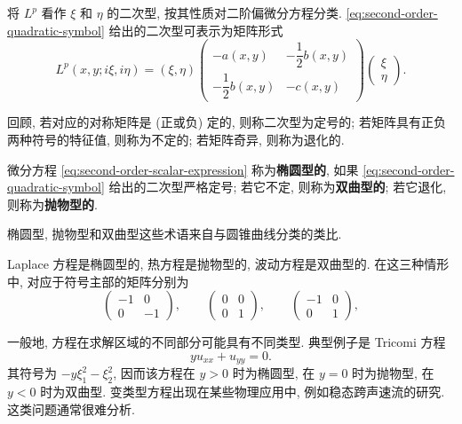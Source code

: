 将 $L^p$ 看作 $\xi$ 和 $\eta$ 的二次型, 按其性质对二阶偏微分方程分类. \eqref{eq:second-order-quadratic-symbol} 给出的二次型可表示为矩阵形式
\begin{equation}\label{eq:second-order-symbol-matrix}
L^p(x,y;i\xi,i\eta)=(\xi,\eta)\begin{pmatrix}-a(x,y)&-\dfrac12b(x,y)\\-\dfrac12b(x,y)&-c(x,y)\end{pmatrix}\begin{pmatrix}\xi\\\eta\end{pmatrix}.
\end{equation}


回顾, 若对应的对称矩阵是 (正或负) 定的, 则称二次型为定号的; 若矩阵具有正负两种符号的特征值, 则称为不定的; 若矩阵奇异, 则称为退化的.

\begin{Definition}
\label{def:second-order-scalar-type}
微分方程 \eqref{eq:second-order-scalar-expression} 称为\textbf{椭圆型的}, 如果 \eqref{eq:second-order-quadratic-symbol} 给出的二次型严格定号; 若它不定, 则称为\textbf{双曲型的}; 若它退化, 则称为\textbf{抛物型的}.
\end{Definition}

椭圆型, 抛物型和双曲型这些术语来自与圆锥曲线分类的类比.

\begin{Example}
\label{ex:classical-pde-types}
Laplace 方程是椭圆型的, 热方程是抛物型的, 波动方程是双曲型的. 在这三种情形中, 对应于符号主部的矩阵分别为
\begin{equation}\label{eq:classical-principal-matrices}
\begin{pmatrix}-1&0\\0&-1\end{pmatrix},\qquad\begin{pmatrix}0&0\\0&1\end{pmatrix},\qquad\begin{pmatrix}-1&0\\0&1\end{pmatrix},
\end{equation}

\end{Example}

\begin{Example}
\label{ex:tricomi-mixed-type}
一般地, 方程在求解区域的不同部分可能具有不同类型. 典型例子是 Tricomi 方程
\begin{equation}\label{eq:tricomi-equation}
yu_{xx}+u_{yy}=0.
\end{equation}
其符号为 $-y\xi_1^2-\xi_2^2$, 因而该方程在 $y>0$ 时为椭圆型, 在 $y=0$ 时为抛物型, 在 $y<0$ 时为双曲型. 变类型方程出现在某些物理应用中, 例如稳态跨声速流的研究. 这类问题通常很难分析.
\end{Example}

